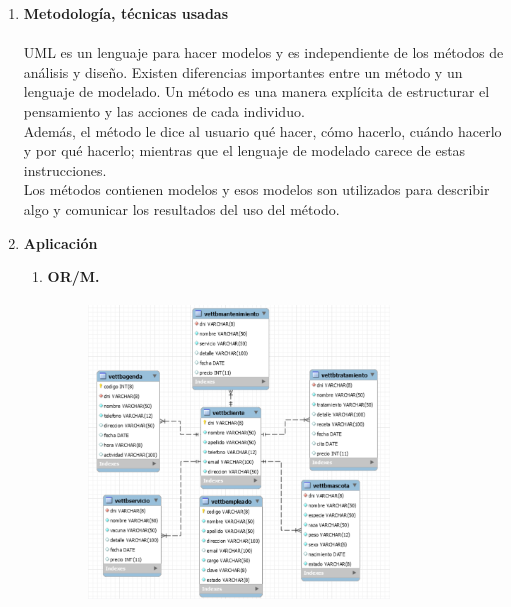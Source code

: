 \documentclass[12pt,a4paper,oneside]{book}
\begin{document}
\begin{enumerate}
\begin{enumerate}
				
				\item \textbf{Metodolog\'ia, t\'ecnicas usadas}\\  \\
						UML es un lenguaje para hacer modelos y es independiente de los métodos de análisis y diseño. Existen diferencias importantes entre un método y un lenguaje de modelado. Un método es una manera explícita de estructurar el pensamiento y las acciones de cada individuo. \\
						
						Además, el método le dice al usuario qué hacer, cómo hacerlo, cuándo hacerlo y por qué hacerlo; mientras que el lenguaje de modelado carece de estas instrucciones. \\ 
						
						Los métodos contienen modelos y esos modelos son utilizados para describir algo y comunicar los resultados del uso del método. \\
		\newpage
				\item \textbf{Aplicaci\'on}  \\
					
					\begin{enumerate}
						\item \textbf{OR/M.}
						
							\begin{figure}[htb]
									\centering \includegraphics[width=8cm, height=8cm]{img/OR/mapa.png}
							\end{figure}
							

\end{enumerate}
\end{enumerate}
\end{enumerate}
\end{document}
